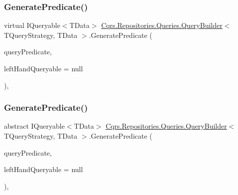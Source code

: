 \subsubsection{\texorpdfstring{Generate\+Predicate()}{GeneratePredicate()}\hspace{0.1cm}{\footnotesize\ttfamily [1/2]}}
{\footnotesize\ttfamily virtual I\+Queryable$<$T\+Data$>$ \hyperlink{classCqrs_1_1Repositories_1_1Queries_1_1QueryBuilder}{Cqrs.\+Repositories.\+Queries.\+Query\+Builder}$<$ T\+Query\+Strategy, T\+Data $>$.Generate\+Predicate (\begin{DoxyParamCaption}\item[{\hyperlink{interfaceCqrs_1_1Repositories_1_1Queries_1_1IQueryPredicate}{I\+Query\+Predicate}}]{query\+Predicate,  }\item[{I\+Queryable$<$ T\+Data $>$}]{left\+Hand\+Queryable = {\ttfamily null} }\end{DoxyParamCaption})\hspace{0.3cm}{\ttfamily [protected]}, {\ttfamily [virtual]}}

\mbox{\label{classCqrs_1_1Repositories_1_1Queries_1_1QueryBuilder_aa38989a8b4808c7c73e7cf038b535ea7}} 
\subsubsection{\texorpdfstring{Generate\+Predicate()}{GeneratePredicate()}\hspace{0.1cm}{\footnotesize\ttfamily [2/2]}}
{\footnotesize\ttfamily abstract I\+Queryable$<$T\+Data$>$ \hyperlink{classCqrs_1_1Repositories_1_1Queries_1_1QueryBuilder}{Cqrs.\+Repositories.\+Queries.\+Query\+Builder}$<$ T\+Query\+Strategy, T\+Data $>$.Generate\+Predicate (\begin{DoxyParamCaption}\item[{\hyperlink{classCqrs_1_1Repositories_1_1Queries_1_1QueryPredicate}{Query\+Predicate}}]{query\+Predicate,  }\item[{I\+Queryable$<$ T\+Data $>$}]{left\+Hand\+Queryable = {\ttfamily null} }\end{DoxyParamCaption})\hspace{0.3cm}{\ttfamily [protected]}, {}}



